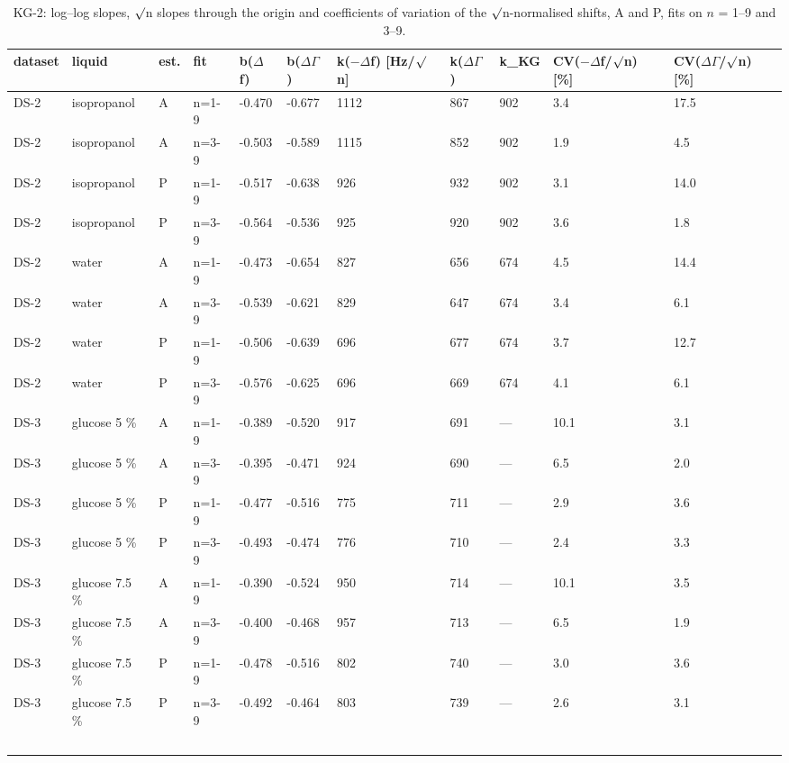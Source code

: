 \documentclass[11pt,a4paper]{article}
\begin{document}
\begin{landscape}{\scriptsize\setlength{\tabcolsep}{2pt}
\begin{longtable}{@{}lllllllllll@{}}
\caption{KG-2: log--log slopes, $\surd$n slopes through the origin and coefficients of variation of the $\surd$n-normalised shifts, A and P, fits on $n$ = 1--9 and 3--9.}\\
\toprule
dataset & liquid & est. & fit & b($\Delta$f) & b($\Delta$$\Gamma$) & k($-$$\Delta$f) [Hz/$\surd$n] & k($\Delta$$\Gamma$) & k\_KG & CV($-$$\Delta$f/$\surd$n) [\%] & CV($\Delta$$\Gamma$/$\surd$n) [\%] \\\midrule\endhead
DS-2 & isopropanol & A & n=1-9 & -0.470 & -0.677 & 1112 & 867 & 902 & 3.4 & 17.5 \\
DS-2 & isopropanol & A & n=3-9 & -0.503 & -0.589 & 1115 & 852 & 902 & 1.9 & 4.5 \\
DS-2 & isopropanol & P & n=1-9 & -0.517 & -0.638 & 926 & 932 & 902 & 3.1 & 14.0 \\
DS-2 & isopropanol & P & n=3-9 & -0.564 & -0.536 & 925 & 920 & 902 & 3.6 & 1.8 \\
DS-2 & water & A & n=1-9 & -0.473 & -0.654 & 827 & 656 & 674 & 4.5 & 14.4 \\
DS-2 & water & A & n=3-9 & -0.539 & -0.621 & 829 & 647 & 674 & 3.4 & 6.1 \\
DS-2 & water & P & n=1-9 & -0.506 & -0.639 & 696 & 677 & 674 & 3.7 & 12.7 \\
DS-2 & water & P & n=3-9 & -0.576 & -0.625 & 696 & 669 & 674 & 4.1 & 6.1 \\
DS-3 & glucose 5 \% & A & n=1-9 & -0.389 & -0.520 & 917 & 691 & --- & 10.1 & 3.1 \\
DS-3 & glucose 5 \% & A & n=3-9 & -0.395 & -0.471 & 924 & 690 & --- & 6.5 & 2.0 \\
DS-3 & glucose 5 \% & P & n=1-9 & -0.477 & -0.516 & 775 & 711 & --- & 2.9 & 3.6 \\
DS-3 & glucose 5 \% & P & n=3-9 & -0.493 & -0.474 & 776 & 710 & --- & 2.4 & 3.3 \\
DS-3 & glucose 7.5 \% & A & n=1-9 & -0.390 & -0.524 & 950 & 714 & --- & 10.1 & 3.5 \\
DS-3 & glucose 7.5 \% & A & n=3-9 & -0.400 & -0.468 & 957 & 713 & --- & 6.5 & 1.9 \\
DS-3 & glucose 7.5 \% & P & n=1-9 & -0.478 & -0.516 & 802 & 740 & --- & 3.0 & 3.6 \\
DS-3 & glucose 7.5 \% & P & n=3-9 & -0.492 & -0.464 & 803 & 739 & --- & 2.6 & 3.1 \\
$$
\end{longtable}}
\end{landscape}
\end{document}
